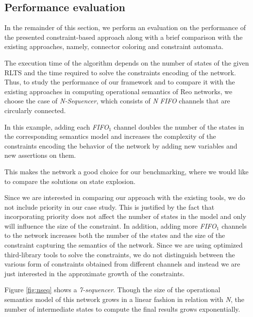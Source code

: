 \subsection{Performance evaluation}
In the remainder of this section, we perform an evaluation on the performance of the presented constraint-based approach along with a brief comparison with the existing approaches, namely, connector coloring and constraint automata. 
 
The execution time of the algorithm depends on the number of states of the given RLTS and the time required to solve the constraints encoding of the network. Thus, to study the performance of our framework and to compare it with the existing approaches in computing operational semantics of Reo networks, we choose 
the case of \emph{N-Sequencer}, which consists of \emph{N} \emph{FIFO} channels that are circularly connected. 

In this example, adding each \emph{FIFO}$_1$ channel doubles the number of the states in the corresponding semantics model and increases the complexity of the constraints encoding the behavior of the network by adding new variables and new assertions on them. 

This makes the network a good choice for our benchmarking, where we would like to compare the solutions on state explosion.

Since we are interested in comparing our approach with the existing tools, we do not include priority in our case study. This is justified by the fact that incorporating priority does not affect the number of states in the model and only will influence the size of the constraint. In addition, adding more \emph{FIFO}$_1$ channels to the network increases both the number of the states and the size of the constraint capturing the semantics of the network. Since we are using optimized third-library tools to solve the constraints, we do not distinguish between the various form of constraints obtained from different channels and instead we are just interested in the approximate growth of the constraints. 
 
Figure \ref{fig:nseq} shows a \emph{7-sequencer}. Though the size of the operational semantics model of this network grows in a linear fashion in relation with \emph{N}, the number of intermediate states to compute the final results grows exponentially. 

